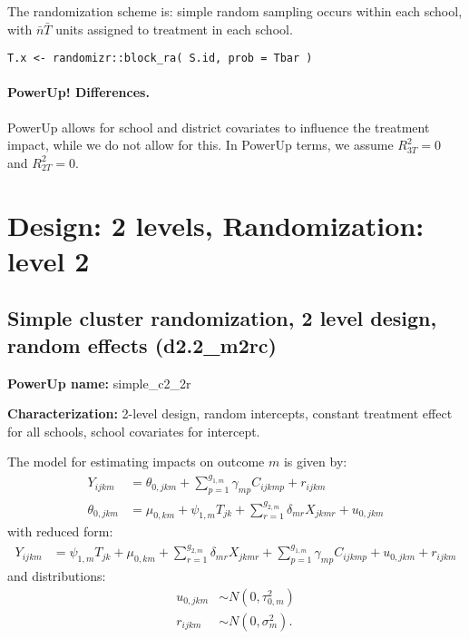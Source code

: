 \documentclass[12pt]{article}
\begin{document}
The randomization scheme is: simple random sampling occurs within each school, with $\bar{n}\bar{T}$ units assigned to treatment in each school.
\begin{verbatim}
T.x <- randomizr::block_ra( S.id, prob = Tbar )
\end{verbatim}

\paragraph{PowerUp! Differences.}
PowerUp allows for school and district covariates to influence the treatment impact, while we do not allow for this. In PowerUp terms, we assume $R^2_{3T} = 0$ and $R^2_{2T} = 0$.





\newpage 
\section{Design: 2 levels, Randomization: level 2}


\subsection{Simple cluster randomization, 2 level design, random effects (d2.2\_m2rc)}

\textbf{PowerUp name:} simple\_c2\_2r

\textbf{Characterization:} 2-level design, random intercepts, constant treatment effect for all schools, school covariates for intercept.

The model for estimating impacts on outcome $m$ is given by:
\begin{align}
Y_{ijkm} &=  \theta_{0,jkm} + \sum_{p=1}^{g_{1,m}} \gamma_{mp} C_{ijkmp} + r_{ijkm}\\
\nonumber \theta_{0,jkm} &= \mu_{0,km} + \psi_{1,m} T_{jk} + \sum_{r=1}^{g_{2,m}} \delta_{mr} X_{jkmr} + u_{0,jkm}
\end{align}
with reduced form:
\begin{align}
Y_{ijkm} &= \psi_{1,m} T_{jk} + \mu_{0,km} + \sum_{r=1}^{g_{2,m}} \delta_{mr} X_{jkmr} + \sum_{p=1}^{g_{1,m}} \gamma_{mp} C_{ijkmp} + u_{0,jkm} + r_{ijkm}
\end{align}
and distributions:
\begin{align}
u_{0,jkm} &\sim N\left(0, \tau^2_{0,m}\right)\\
\nonumber r_{ijkm} &\sim N\left(0, \sigma^2_m\right).
\end{align}
\end{document}
